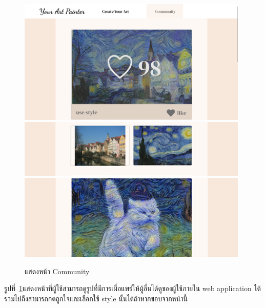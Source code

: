 \documentclass[12pt,oneside,openright,a4paper]{cpe-thai-project}
\begin{document}
\newpage

\begin{figure}[!h]
  \centering
  \includegraphics[width=11cm]{./image/ui-commu1.png}
  \includegraphics[width=11cm]{./image/ui-commu2.png}
  \includegraphics[width=11cm]{./image/ui-commu3.png}
  \caption{แสดงหน้า Community}
  \label{fig:ui-commu}
\end{figure}

\par\setlength{\parindent}{5ex}
รูปที่~\ref{fig:ui-commu}แสดงหน้าที่ผู้ใช้สามารถดูรูปที่มีการเผื่อแพร่ให้ผู้อื่นได้ดูของผู้ใช้ภายใน web application ได้ รวมไปถึงสามารถกดถูกใจและเลือกใช้ style นั้นได้ถ้าหากชอบจากหน้านี้

\newpage
\end{document}
